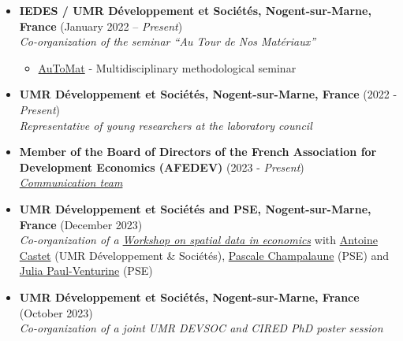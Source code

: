 \documentclass[
]{article}
\providecommand{\tightlist}{%
  \setlength{\itemsep}{0pt}\setlength{\parskip}{0pt}}
\begin{document}
\begin{itemize}
\item
  \textbf{IEDES / UMR Développement et Sociétés, Nogent-sur-Marne,
  France} (January 2022 -- \emph{Present})\\
  \emph{Co-organization of the seminar ``Au Tour de Nos Matériaux''}

  \begin{itemize}
  \tightlist
  \item
    \href{https://jeanbaptisteguiffard.github.io/automat.html}{AuToMat}
    - Multidisciplinary methodological seminar
  \end{itemize}
\item
  \textbf{UMR Développement et Sociétés, Nogent-sur-Marne, France} (2022
  - \emph{Present})\\
  \emph{Representative of young researchers at the laboratory council}
\item
  \textbf{Member of the Board of Directors of the French Association for
  Development Economics (AFEDEV)} (2023 - \emph{Present})\\
  \href{https://afedev.fr/}{\emph{Communication team}}
\item
  \textbf{UMR Développement et Sociétés and PSE, Nogent-sur-Marne,
  France} (December 2023)\\
  \emph{Co-organization of a
  \href{https://umr-devsoc.pantheonsorbonne.fr/evenements/journee-detudes-donnees-spatiales-nouvelles-sources-nouvelles-perspectives}{Workshop
  on spatial data in economics}} with
  \href{https://sites.google.com/view/antoinecastet}{Antoine Castet}
  (UMR Développement \& Sociétés),
  \href{https://www.parisschoolofeconomics.eu/fr/champalaune-pascale/}{Pascale
  Champalaune} (PSE) and
  \href{https://julia-paulventurine.github.io/}{Julia Paul-Venturine}
  (PSE)
\item
  \textbf{UMR Développement et Sociétés, Nogent-sur-Marne, France}
  (October 2023)\\
  \emph{Co-organization of a joint UMR DEVSOC and CIRED PhD poster
  session}
\end{itemize}
\end{document}
